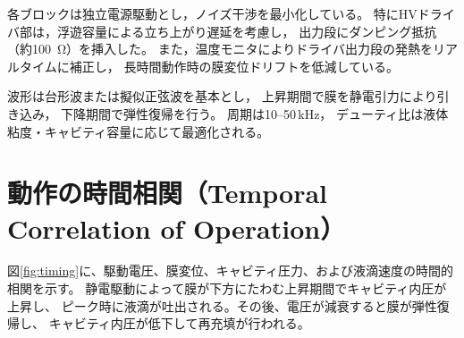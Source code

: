 \documentclass[conference]{IEEEtran}
\begin{document}
\begin{table}[t]
\centering
\caption{静電MEMSアクチュエータ駆動信号フロー}
\label{tab:flow}
\end{table}

各ブロックは独立電源駆動とし，ノイズ干渉を最小化している。
特にHVドライバ部は，浮遊容量による立ち上がり遅延を考慮し，
出力段にダンピング抵抗（約\SI{100}{\ohm}）を挿入した。
また，温度モニタによりドライバ出力段の発熱をリアルタイムに補正し，
長時間動作時の膜変位ドリフトを低減している。

波形は台形波または擬似正弦波を基本とし，
上昇期間で膜を静電引力により引き込み，
下降期間で弾性復帰を行う。
周期は10--50\,kHz，
デューティ比は液体粘度・キャビティ容量に応じて最適化される。

\section{動作の時間相関（Temporal Correlation of Operation）}
図\ref{fig:timing}に、駆動電圧、膜変位、キャビティ圧力、および液滴速度の時間的相関を示す。
静電駆動によって膜が下方にたわむ上昇期間でキャビティ内圧が上昇し、
ピーク時に液滴が吐出される。その後、電圧が減衰すると膜が弾性復帰し、
キャビティ内圧が低下して再充填が行われる。
\end{document}
